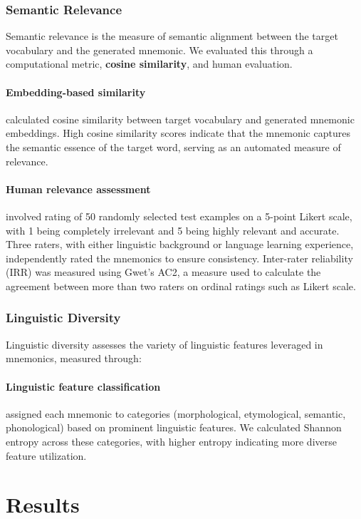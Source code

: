 \documentclass{article}
\newcounter{para}
\begin{document}
\subsubsection{Semantic Relevance} \label{sec:relevance-eval}
Semantic relevance is the measure of semantic alignment between the target vocabulary and the generated mnemonic. We evaluated this through a computational metric, \textbf{cosine similarity}, and human evaluation.

\paragraph{Embedding-based similarity} calculated cosine similarity between target vocabulary and generated mnemonic embeddings. High cosine similarity scores indicate that the mnemonic captures the semantic essence of the target word, serving as an automated measure of relevance.
\paragraph{Human relevance assessment} involved rating of 50 randomly selected test examples on a 5-point Likert scale, with 1 being completely irrelevant and 5 being highly relevant and accurate. Three raters, with either linguistic background or language learning experience, independently rated the mnemonics to ensure consistency. Inter-rater reliability (IRR) was measured using Gwet's AC2, a measure used to calculate the agreement between more than two raters on ordinal ratings such as Likert scale.

\subsubsection{Linguistic Diversity} \label{sec:diversity-eval}
Linguistic diversity assesses the variety of linguistic features leveraged in mnemonics, measured through:
\paragraph{Linguistic feature classification} assigned each mnemonic to categories (morphological, etymological, semantic, phonological) based on prominent linguistic features. We calculated Shannon entropy across these categories, with higher entropy indicating more diverse feature utilization.

\section{Results} \label{sec:results}
\end{document}
